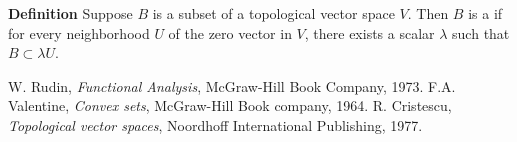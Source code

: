 \documentclass[12pt]{article}
\begin{document}
{\bf Definition} 
Suppose $B$ is a subset of a topological vector space $V$. 
Then $B$ is a \emph{} if for every neighborhood $U$ of 
the zero vector in $V$, there
exists a scalar $\lambda$ such that $B\subset \lambda U$.

\begin{thebibliography}{9}
 W. Rudin, \emph{Functional Analysis},
 McGraw-Hill Book Company, 1973.
 F.A. Valentine, \emph{Convex sets}, McGraw-Hill Book company, 1964.
 R. Cristescu, \emph{Topological vector spaces},
Noordhoff International Publishing, 1977.
\end{thebibliography}
\end{document}

